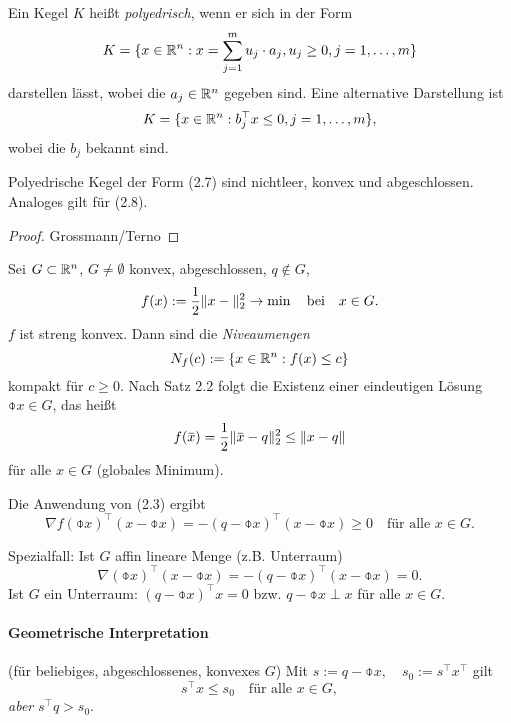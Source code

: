 \begin{defn}
  Ein Kegel $K$ heißt \emph{polyedrisch}, wenn er sich in der Form
  \begin{equation} %
    K = \{ x \in \real^n : x = \sum_{j=1}^m u_j \cdot a_j, u_j \ge 0, j = 1,
    \ldots, m \}
  \end{equation}
  darstellen lässt, wobei die $a_j \in \mathbb{R}^n$ gegeben sind. Eine alternative
  Darstellung ist
  \begin{equation} %
    K = \{ x \in \real^n : b_j^\top x \le 0, j = 1, \ldots, m \},
  \end{equation}
  wobei die $b_j$ bekannt sind.
\end{defn}

\begin{lem} %
  Polyedrische Kegel der Form (2.7) sind nichtleer, konvex und abgeschlossen.
  Analoges gilt für (2.8).
\end{lem}

\begin{proof}
  Grossmann/Terno
\end{proof}

\begin{exmp}
  Sei $G \subset \mathbb{R}^n$, $G \ne \emptyset$ konvex, abgeschlossen, $q \notin
  G$,
  \[ f(x) := \frac{1}{2} \| x - \|_2^2 \to \min \quad \text{bei} \quad x \in G. \]
  $f$ ist streng konvex. Dann sind die \emph{Niveaumengen}
  \[ N_f(c) := \{ x \in \mathbb{R}^n : f(x) \le c \} \]
  kompakt für $c \ge 0$. Nach Satz 2.2 folgt die Existenz einer eindeutigen
  Lösung $\obar{x} \in G$, das heißt
  \[ f( \obar{x} ) = \rez{2} \| \obar{x} - q \|_2^2 \le \| x - q \| \]
  für alle $x \in G$ (globales Minimum).

  Die Anwendung von (2.3) ergibt
  \[ \nabla f( \obar{x} )^\top (x-\obar{x}) = - (q-\obar{x})^\top(x-\obar{x}) \ge 0
    \quad \text{für alle } x \in G. \]

  Spezialfall: Ist $G$ affin lineare Menge (z.B. Unterraum)
  \[ \nabla(\obar{x})^\top (x-\obar{x}) = - (q-\obar{x})^\top(x-\obar{x}) = 0. \]
  Ist $G$ ein Unterraum: $(q-\obar{x})^\top x = 0$ bzw. $q-\obar{x} \perp x$ für
  alle $x \in G$.

  \paragraph{Geometrische Interpretation}
  (für beliebiges, abgeschlossenes, konvexes $G$)
  Mit $s := q - \obar{x}, \quad s_0 := s^\top x^\top$ gilt
  \[ s^\top x \le s_0 \quad \text{für alle } x \in G, \]
  \emph{aber} $s^\top q > s_0$.
\end{exmp}

